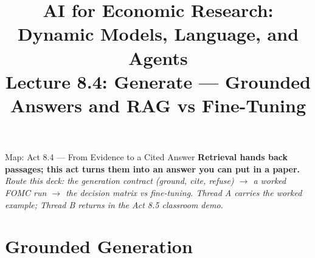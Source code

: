


\usepackage{colortbl}

\usetikzlibrary{arrows.meta, positioning, shapes, shapes.geometric, fit, calc, backgrounds}

\graphicspath{{./pic/}{./figures/}{../../MiniCourse_8hr/Slides/Module4_Agentic_AI/pic/}{../}}



\title[AI for Econ Research]{AI for Economic Research: Dynamic Models, Language, and Agents\\
Lecture 8.4: Generate --- Grounded Answers and RAG vs Fine-Tuning}



\makebeamertitle

\begin{frame}{Map: Act 8.4 --- From Evidence to a Cited Answer}
\textbf{Retrieval hands back passages; this act turns them into an answer you can put in a paper.}
\textit{\footnotesize Route this deck: the generation contract (ground, cite, refuse) $\to$ a worked FOMC run $\to$ the decision matrix vs fine-tuning.
Thread A carries the worked example; Thread B returns in the Act 8.5 classroom demo.}
\end{frame}

\section{Grounded Generation}

